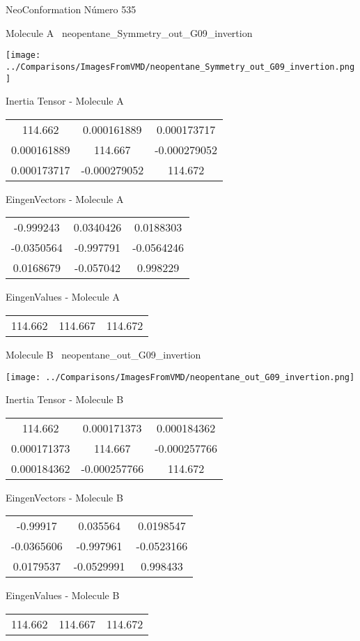 \vtab[-3cm]
\begin{center}
{\large NeoConformation \tab Número 535}
\end{center}
\begin{multicols}{2}
\begin{center}

Molecule A \
neopentane\_Symmetry\_out\_G09\_invertion

\texttt{[image: ../Comparisons/ImagesFromVMD/neopentane\_Symmetry\_out\_G09\_invertion.png]}

Inertia Tensor - Molecule A \\
\begin{tabular}{|c c c|}
114.662	 & 	0.000161889	 & 	0.000173717	 \\
0.000161889	 & 	114.667	 & 	-0.000279052	 \\
0.000173717	 & 	-0.000279052	 & 	114.672
\end{tabular}

\vtab
 EingenVectors - Molecule A     \\
\begin{tabular}{|c c c|}
-0.999243	 & 	0.0340426	 & 	0.0188303	 \\
-0.0350564	 & 	-0.997791	 & 	-0.0564246	 \\
0.0168679	 & 	-0.057042	 & 	0.998229
\end{tabular}

\vtab
 EingenValues - Molecule A     \\
\begin{tabular}{|c c c|}
114.662	 & 	114.667	 & 	114.672	 \\
\end{tabular}
\columnbreak

Molecule B \
neopentane\_out\_G09\_invertion

\texttt{[image: ../Comparisons/ImagesFromVMD/neopentane\_out\_G09\_invertion.png]}

Inertia Tensor - Molecule B \\
\begin{tabular}{|c c c|}
114.662	 & 	0.000171373	 & 	0.000184362	 \\
0.000171373	 & 	114.667	 & 	-0.000257766	 \\
0.000184362	 & 	-0.000257766	 & 	114.672
\end{tabular}

\vtab
 EingenVectors - Molecule B     \\
\begin{tabular}{|c c c|}
-0.99917	 & 	0.035564	 & 	0.0198547	 \\
-0.0365606	 & 	-0.997961	 & 	-0.0523166	 \\
0.0179537	 & 	-0.0529991	 & 	0.998433
\end{tabular}

\vtab
 EingenValues - Molecule B     \\
\begin{tabular}{|c c c|}
114.662	 & 	114.667	 & 	114.672	 \\
\end{tabular}

\end{center}
\end{multicols}

